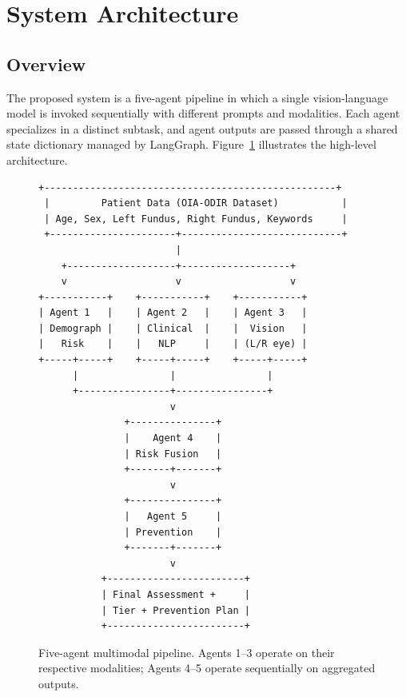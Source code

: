 \documentclass[11pt,a4paper]{article}
\begin{document}
\section{System Architecture}

\subsection{Overview}

The proposed system is a five-agent pipeline in which a single vision-language model is invoked sequentially with different prompts and modalities. Each agent specializes in a distinct subtask, and agent outputs are passed through a shared state dictionary managed by LangGraph. Figure~\ref{fig:arch} illustrates the high-level architecture.

\begin{figure}[H]
\centering
\begin{lstlisting}[basicstyle=\ttfamily\footnotesize]
 +---------------------------------------------------+
 |         Patient Data (OIA-ODIR Dataset)           |
 | Age, Sex, Left Fundus, Right Fundus, Keywords     |
 +----------------------+----------------------------+
                        |
    +-------------------+-------------------+
    v                   v                   v
+-----------+    +-----------+    +-----------+
| Agent 1   |    | Agent 2   |    | Agent 3   |
| Demograph |    | Clinical  |    |  Vision   |
|   Risk    |    |   NLP     |    | (L/R eye) |
+-----+-----+    +-----+-----+    +-----+-----+
      |                |                |
      +----------------+----------------+
                       v
               +---------------+
               |    Agent 4    |
               | Risk Fusion   |
               +-------+-------+
                       v
               +---------------+
               |   Agent 5     |
               | Prevention    |
               +-------+-------+
                       v
           +------------------------+
           | Final Assessment +     |
           | Tier + Prevention Plan |
           +------------------------+
\end{lstlisting}
\caption{Five-agent multimodal pipeline. Agents 1--3 operate on their respective modalities; Agents 4--5 operate sequentially on aggregated outputs.}
\label{fig:arch}
\end{figure}
\end{document}
